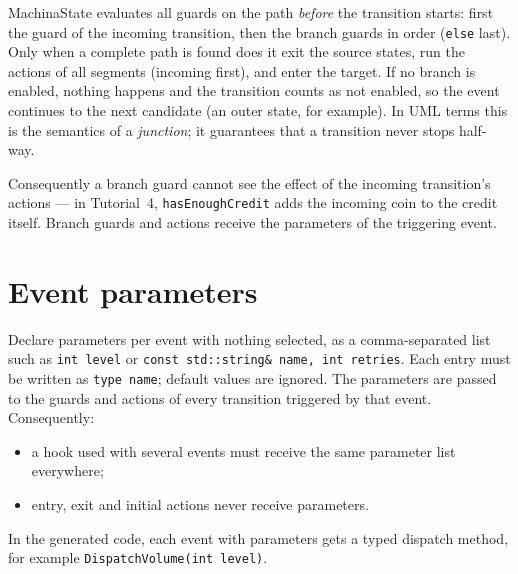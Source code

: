 \documentclass[11pt,a4paper,openany]{report}
\newcommand{\code}[1]{\texttt{#1}}
\begin{document}
MachinaState evaluates all guards on the path \emph{before} the transition starts: first the guard of
the incoming transition, then the branch guards in order (\code{else} last). Only when a complete path
is found does it exit the source states, run the actions of all segments (incoming first), and enter
the target. If no branch is enabled, nothing happens and the transition counts as not enabled, so the
event continues to the next candidate (an outer state, for example). In UML terms this is the
semantics of a \emph{junction}; it guarantees that a transition never stops half-way.

Consequently a branch guard cannot see the effect of the incoming transition's actions --- in
Tutorial~4, \code{hasEnoughCredit} adds the incoming coin to the credit itself. Branch guards and actions
receive the parameters of the triggering event.

\section{Event parameters}
\label{sec:params}
Declare parameters per event with nothing selected, as a comma-separated list such as
\code{int level} or \code{const std::string\& name, int retries}. Each entry must be written as
\code{type name}; default values are ignored. The parameters are passed to the guards and actions of
every transition triggered by that event. Consequently:
\begin{itemize}[itemsep=1pt]
  \item a hook used with several events must receive the same parameter list everywhere;
  \item entry, exit and initial actions never receive parameters.
\end{itemize}
In the generated code, each event with parameters gets a typed dispatch method, for example
\code{DispatchVolume(int level)}.
\end{document}
